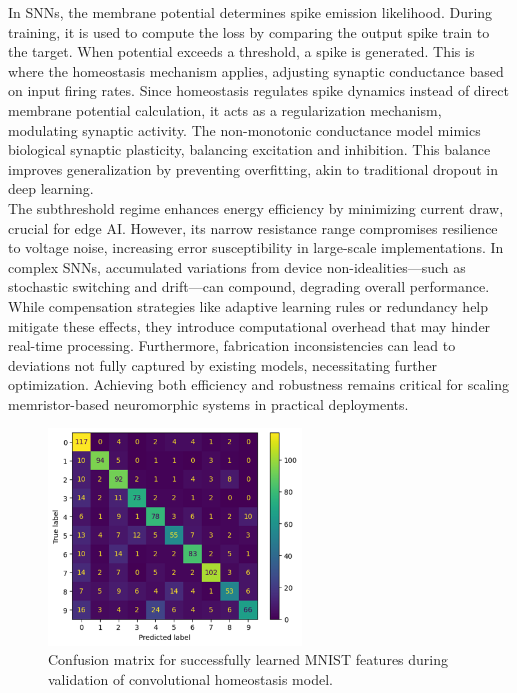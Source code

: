 \noindent In SNNs, the membrane potential determines spike emission likelihood. During training, it is used to compute the loss by comparing the output spike train to the target. When potential exceeds a threshold, a spike is generated. This is where the homeostasis mechanism applies, adjusting synaptic conductance based on input firing rates. Since homeostasis regulates spike dynamics instead of direct membrane potential calculation, it acts as a regularization mechanism, modulating synaptic activity. The non-monotonic conductance model mimics biological synaptic plasticity, balancing excitation and inhibition. This balance improves generalization by preventing overfitting, akin to traditional dropout in deep learning.\\


\noindent The subthreshold regime enhances energy efficiency by minimizing current draw, crucial for edge AI. However, its narrow resistance range compromises resilience to voltage noise, increasing error susceptibility in large-scale implementations. In complex SNNs, accumulated variations from device non-idealities—such as stochastic switching and drift—can compound, degrading overall performance. While compensation strategies like adaptive learning rules or redundancy help mitigate these effects, they introduce computational overhead that may hinder real-time processing. Furthermore, fabrication inconsistencies can lead to deviations not fully captured by existing models, necessitating further optimization. Achieving both efficiency and robustness remains critical for scaling memristor-based neuromorphic systems in practical deployments.\\

\begin{figure}[!t]
    \centerline{\includegraphics[width=0.6\textwidth]{Chapter7/Figs/e.png}}
    \caption[Confusion matrix of convolutional homeostasis model.]{Confusion matrix for successfully learned MNIST features during validation of convolutional homeostasis model.}
    \label{fig:7e}
\end{figure}

